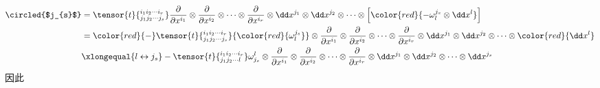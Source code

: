 \[
\begin{split}
\circled{$j_{s}$}&=\tensor{t}{^{i_{1}i_{2}\cdots i_{r}}_{j_{1}j_{2}\cdots j_{s}}}\frac { \partial } { \partial x ^ { i_{1} } }\otimes\frac { \partial } { \partial x ^ { i_{2} } }\otimes\cdots\otimes\frac { \partial } { \partial x ^ { i_{r} } }\otimes \dd x^{j_{1}}\otimes\dd x^{j_{2}}\otimes\cdots\otimes \left[  {\color{red}{-\omega_{l}^{j_{s}}\otimes \dd x^{l}}}\right]\\
&={\color{red}{-}}\tensor{t}{^{i_{1}i_{2}\cdots i_{r}}_{j_{1}j_{2}\cdots j_{s}}}{\color{red}{\omega_{l}^{j_{s}}}}\otimes\frac { \partial } { \partial x ^ { i_{1} } }\otimes\frac { \partial } { \partial x ^ { i_{2} } }\otimes\cdots\otimes\frac { \partial } { \partial x ^ { i_{r} } }\otimes  \dd x^{j_{1}}\otimes\dd x^{j_{2}}\otimes\cdots\otimes{\color{red}{ \dd x^{l}}}  \\
&\xlongequal{l\leftrightarrow j_{s}}-\tensor{t}{^{i_{1}i_{2}\cdots i_{r}}_{j_{1} j_{2}\cdots l}}\omega^{l}_{j_{s}}\otimes\frac { \partial } { \partial x ^ { i_{1} } }\otimes\frac { \partial } { \partial x ^ { i_{2} } }\otimes\cdots\otimes\frac { \partial } { \partial x ^ { i_{r} } }\otimes   \dd x^{j_{1}}\otimes\dd x^{j_{2}}\otimes\cdots\otimes\dd x^{j_{s}}  \\
\end{split}
\]
因此
